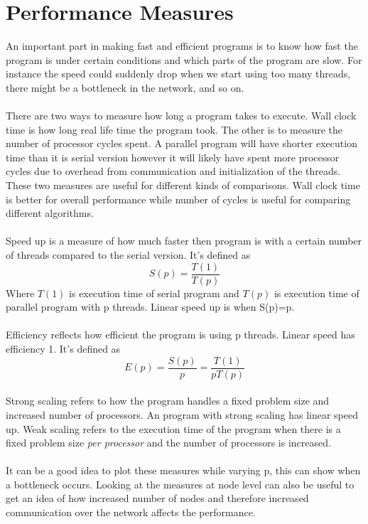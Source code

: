 \documentclass[10pt,a4paper]{report}
\begin{document}
\section{Performance Measures}
An important part in making fast and efficient programs is to know how fast the program is under certain conditions and which parts of the program are slow\cite{introduction_hpc_hager}. For instance the speed could suddenly drop when we start using too many threads, there might be a bottleneck in the network, and so on.\\
\\
There are two ways to measure how long a program takes to execute\cite{introduction_hpc_hager}. Wall clock time is how long real life time the program took. The other is to measure the number of processor cycles spent. A parallel program will have shorter execution time than it is serial version however it will likely have spent more processor cycles due to overhead from communication and initialization of the threads. These two measures are useful for different kinds of comparisons. Wall clock time is better for overall performance while number of cycles is useful for comparing different algorithms\cite{introduction_hpc_hager, cuda_best_practice}.\\
\\
Speed up is a measure of how much faster then program is with a certain number of threads compared to the serial version. It's defined as\cite{introduction_hpc_hager}
$$S(p)=\frac{T(1)}{T(p)}$$
Where $T(1)$ is execution time of serial program and $T(p)$ is execution time of parallel program with p threads. Linear speed up is when S(p)=p\cite{introduction_hpc_hager}.\\
\\
Efficiency reflects how efficient the program is using p threads. Linear speed has efficiency 1. It's defined as\cite{introduction_hpc_hager}
$$E(p)=\frac{S(p)}{p}=\frac{T(1)}{pT(p)}$$
\\
Strong scaling refers to how the program handles a fixed problem size and increased number of processors\cite{introduction_hpc_hager}. An program with strong scaling has linear speed up\cite{introduction_hpc_hager}. Weak scaling refers to the execution time of the program when there is a fixed problem size \emph{per processor} and the number of processors is increased\cite{introduction_hpc_hager, cuda_best_practice}.\\
\\
It can be a good idea to plot these measures while varying p, this can show when a bottleneck occurs. Looking at the measures at node level can also be useful to get an idea of how increased number of nodes and therefore increased communication over the network affects the performance.
\end{document}
